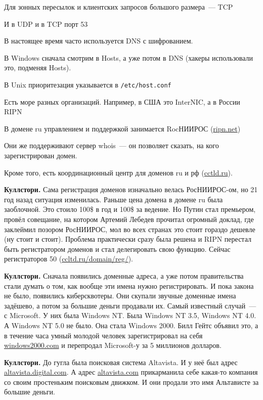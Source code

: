 Для зонных пересылок и клиентских запросов большого размера~--- TCP

И в UDP и в TCP порт 53

В настоящее время часто используется DNS с шифрованием.


В Windows сначала смотрим в Hosts, а уже потом в DNS (хакеры использовали это, подменяя Hosts).

В Unix приоритезация указывается в {\tt /etc/host.conf}


Есть море разных организаций. Например, в США это InterNIC, а в России RIPN

В домене ru управлением и поддержкой занимается RocНИИРОС (\url{ripn.net})

Они же поддерживают сервер whois~--- он позволяет сказать, на кого зарегистрирован домен.

Кроме того, есть координационный центр для доменов ru и рф (\url{cctld.ru}).

{\bf Куллстори.} Сама регистрация доменов изначально велась РосНИИРОС-ом, но 21 год назад ситуация изменилась. Раньше цена домена в домене ru была заоблочной. Это стоило 100\$ в год и 100\$ за ведение. Но Путин стал премьером, провёл совещание, на котором Артемий Лебедев прочитал огромный доклад, где заклеймил позором РосНИИРОС, мол во всех странах это стоит гораздо дешевле (ну стоит и стоит). Проблема практически сразу была решена и RIPN перестал быть регистратором доменов и стал делегировать свою функцию. Сейчас регистраторов 50 (\url{ccltd.ru/domain/reg/}).

{\bf Куллстори.} Сначала появились доменные адреса, а уже потом правительства стали думать о том, как вообще эти имена нужно регистрировать. И пока закона не было, появились киберсквотеры. Они скупали звучные доменные имена задёшево, а потом за большие деньги продавали их. Самый известный случай~--- с Microsoft. У них была Windows NT. Была Windows NT 3.5, Windows NT 4.0. А Windows NT 5.0 не было. Она стала Windows 2000. Билл Гейтс объявил это, а в течение часа умный молодой человек зарегистрировал на себя \url{windows2000.com} и перепродал Microsoft-у за 5 миллионов долларов.

{\bf Куллстори.} До гугла была поисковая система Altavista. И у неё был адрес \url{altavista.digital.com}. А адрес \url{altavista.com} прикарманила себе какая-то компания со своим простеньким поисковым движком. И они продали это имя Альтависте за большие деньги. 

